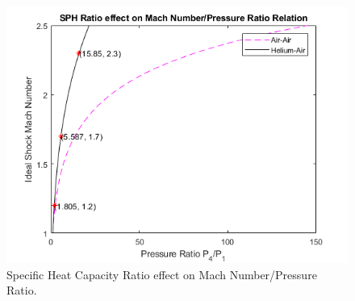 \begin{figure}[H] 
	\centering
	\includegraphics[scale=0.9]{fig1.png} 
	\caption{Specific Heat Capacity Ratio effect on Mach Number/Pressure Ratio.}
	\label{fig:15}
\end{figure}



